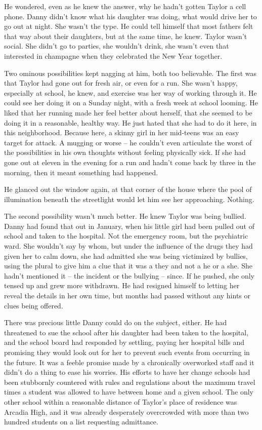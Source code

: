 He wondered, even as he knew the answer, why he hadn't gotten Taylor a cell phone. Danny didn't know what his daughter was doing, what would drive her to go out at night. She wasn't the type. He could tell himself that most fathers felt that way about their daughters, but at the same time, he knew. Taylor wasn't social. She didn't go to parties, she wouldn't drink, she wasn't even that interested in champagne when they celebrated the New Year together.

Two ominous possibilities kept nagging at him, both too believable. The first was that Taylor had gone out for fresh air, or even for a run. She wasn't happy, especially at school, he knew, and exercise was her way of working through it. He could see her doing it on a Sunday night, with a fresh week at school looming. He liked that her running made her feel better about herself, that she seemed to be doing it in a reasonable, healthy way. He just hated that she had to do it here, in this neighborhood. Because here, a skinny girl in her mid-teens was an easy target for attack. A mugging or worse -- he couldn't even articulate the worst of the possibilities in his own thoughts without feeling physically sick. If she had gone out at eleven in the evening for a run and hadn't come back by three in the morning, then it meant something had happened.

He glanced out the window again, at that corner of the house where the pool of illumination beneath the streetlight would let him see her approaching. Nothing.

The second possibility wasn't much better. He knew Taylor was being bullied. Danny had found that out in January, when his little girl had been pulled out of school and taken to the hospital. Not the emergency room, but the psychiatric ward. She wouldn't say by whom, but under the influence of the drugs they had given her to calm down, she had admitted she was being victimized by bullies, using the plural to give him a clue that it was a they and not a he or a she. She hadn't mentioned it -- the incident or the bullying -- since. If he pushed, she only tensed up and grew more withdrawn. He had resigned himself to letting her reveal the details in her own time, but months had passed without any hints or clues being offered.

There was precious little Danny could do on the subject, either. He had threatened to sue the school after his daughter had been taken to the hospital, and the school board had responded by settling, paying her hospital bills and promising they would look out for her to prevent such events from occurring in the future. It was a feeble promise made by a chronically overworked staff and it didn't do a thing to ease his worries. His efforts to have her change schools had been stubbornly countered with rules and regulations about the maximum travel times a student was allowed to have between home and a given school. The only other school within a reasonable distance of Taylor's place of residence was Arcadia High, and it was already desperately overcrowded with more than two hundred students on a list requesting admittance.


